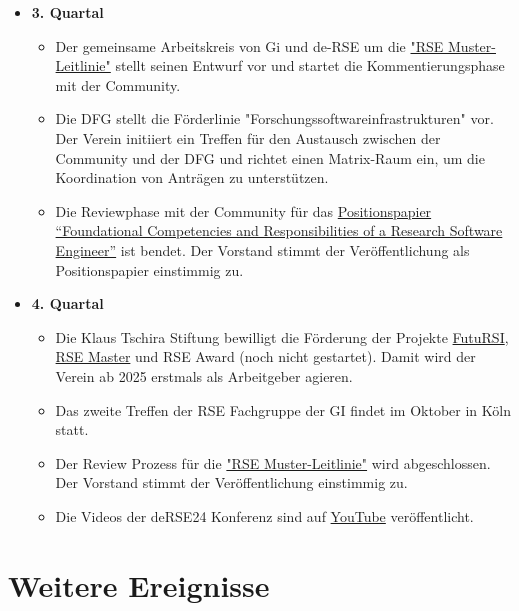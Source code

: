 \begin{itemize}
\begin{itemize}
    
   \end{itemize}
 \item[] \textbf{3. Quartal}
   \begin{itemize}

    \item Der gemeinsame Arbeitskreis von Gi und de-RSE um die \href{https://doi.org/10.18420/2025-gi_de-rse}{"RSE Muster-Leitlinie"} stellt seinen Entwurf vor und startet die Kommentierungsphase mit der Community.
    \item Die DFG stellt die Förderlinie "Forschungssoftwareinfrastrukturen" vor. Der Verein initiiert ein Treffen für den Austausch zwischen der Community und der DFG und richtet einen Matrix-Raum ein, um die Koordination von Anträgen zu unterstützen.
    \item Die Reviewphase mit der Community für das  \href{https://doi.org/10.12688/f1000research.157778.2}{Positionspapier “Foundational Competencies and Responsibilities of a Research Software Engineer”} ist bendet. Der Vorstand stimmt der Veröffentlichung als Positionspapier einstimmig zu.

   \end{itemize}
 \item[] \textbf{4. Quartal}
   \begin{itemize}
    \item Die Klaus Tschira Stiftung bewilligt die Förderung der Projekte \href{https://www.futursi.de/}{FutuRSI}, \href{https://the-teachingrse-project.github.io/RSE-Masters/}{RSE Master} und RSE Award (noch nicht gestartet).
    Damit wird der Verein ab 2025 erstmals als Arbeitgeber agieren.
    \item Das zweite Treffen der RSE Fachgruppe der GI findet im Oktober in Köln statt.
    \item Der Review Prozess für die \href{https://doi.org/10.18420/2025-gi_de-rse}{"RSE Muster-Leitlinie"} wird abgeschlossen. Der Vorstand stimmt der Veröffentlichung einstimmig zu.
    \item Die Videos der deRSE24 Konferenz sind auf \href{https://www.youtube.com/@de-RSE-conferences/videos}{YouTube} veröffentlicht.
   \end{itemize}
\end{itemize}
\clearpage
\section{Weitere Ereignisse}

